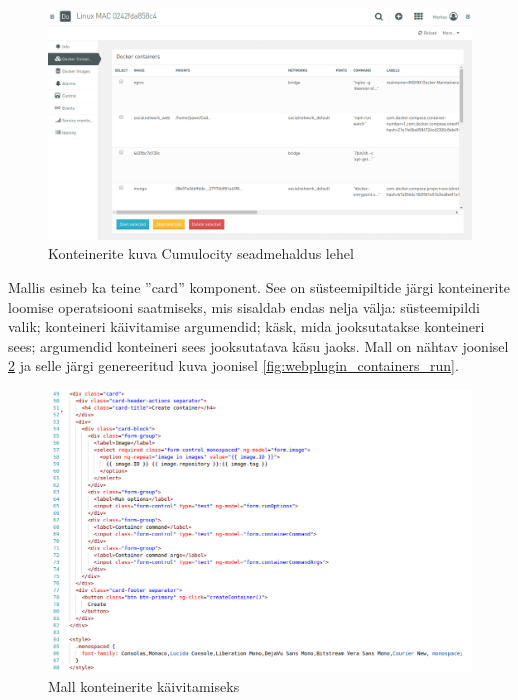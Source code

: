 \documentclass[12pt]{article}
\begin{document}
 \FloatBarrier

 \begin{figure} [ht] %
 \begin{center}
 \includegraphics[width=1\textwidth]{webplugin_containers_table}
 \caption{Konteinerite kuva Cumulocity seadmehaldus lehel}
 \label{fig:webplugin_containers_table}
 \end{center}
 \end{figure}
 
 \FloatBarrier

 Mallis esineb ka teine ''card'' komponent. See on süsteemipiltide järgi konteinerite
 loomise operatsiooni saatmiseks, mis sisaldab endas nelja välja:
 süsteemipildi valik; konteineri käivitamise argumendid; käsk, mida jooksutatakse
 konteineri sees; argumendid konteineri sees jooksutatava käsu jaoks. Mall on
 nähtav joonisel \ref{fig:webplugin_containers_run_template} ja selle järgi 
 genereeritud kuva joonisel \ref{fig:webplugin_containers_run}.
 
 \begin{figure} [ht] %
 \begin{center}
 \includegraphics[width=1\textwidth]{webplugin_containers_run_template}
 \caption{Mall konteinerite käivitamiseks}
 \label{fig:webplugin_containers_run_template}
 \end{center}
 \end{figure}
 
\end{document}
